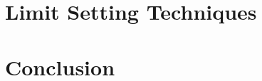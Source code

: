 \documentclass[NOTE, atlasdraft=true, texlive=2016, UKenglish]{\ATLASLATEXPATH atlasdoc}
\begin{document}
\section{Limit Setting Techniques}

\clearpage


%



%
%
%
%



\section{Conclusion}
\label{sec:conclusion}
\end{document}
